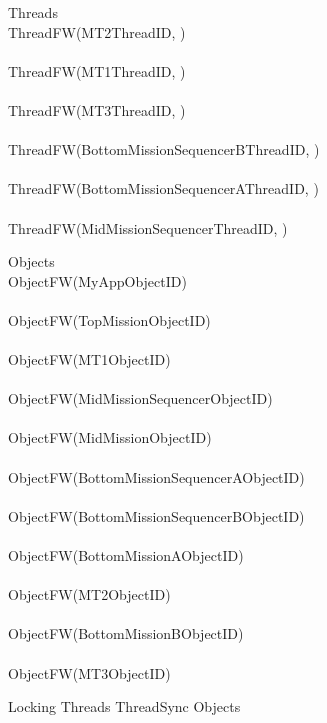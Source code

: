 %
\begin{circus}
\circprocess Threads \circdef  \\
\circblockopen
ThreadFW(MT2ThreadID, ) \\
\interleave \\
ThreadFW(MT1ThreadID, ) \\
\interleave \\
ThreadFW(MT3ThreadID, ) \\
\interleave \\
ThreadFW(BottomMissionSequencerBThreadID, ) \\
\interleave \\
ThreadFW(BottomMissionSequencerAThreadID, ) \\
\interleave \\
ThreadFW(MidMissionSequencerThreadID, ) \\

\circblockclose
\end{circus}
%
%
\begin{circus}
\circprocess Objects \circdef \\
\circblockopen
ObjectFW(MyAppObjectID) \\
\interleave \\
ObjectFW(TopMissionObjectID) \\
\interleave \\
ObjectFW(MT1ObjectID) \\
\interleave \\
ObjectFW(MidMissionSequencerObjectID) \\
\interleave \\
ObjectFW(MidMissionObjectID) \\
\interleave \\
ObjectFW(BottomMissionSequencerAObjectID) \\
\interleave \\
ObjectFW(BottomMissionSequencerBObjectID) \\
\interleave \\
ObjectFW(BottomMissionAObjectID) \\
\interleave \\
ObjectFW(MT2ObjectID) \\
\interleave \\
ObjectFW(BottomMissionBObjectID) \\
\interleave \\
ObjectFW(MT3ObjectID) \\

\circblockclose
\end{circus}
%
%
\begin{circus}
\circprocess Locking \circdef Threads \lpar ThreadSync \rpar Objects
\end{circus}
